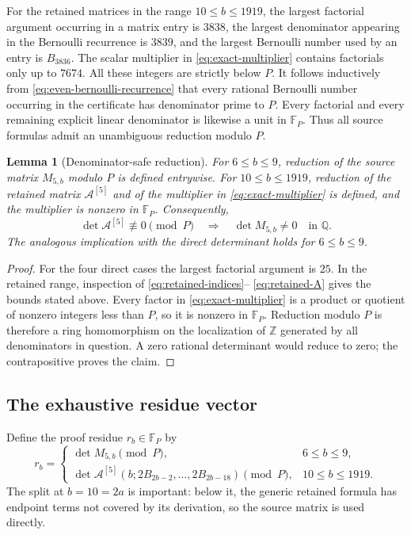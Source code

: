 \documentclass[11pt]{article}
\newtheorem{lemma}[theorem]{Lemma}
\theoremstyle{definition}
\newcommand{\Q}{\mathbb{Q}}
\newcommand{\Z}{\mathbb{Z}}
\newcommand{\F}{\mathbb{F}}
\newcommand{\A}{\mathcal{A}}
\begin{document}
For the retained matrices in the range $10\le b\le1919$, the largest
factorial argument occurring in a matrix entry is $3838$, the largest
denominator appearing in the Bernoulli recurrence is $3839$, and the
largest Bernoulli number used by an entry is $B_{3836}$.  The scalar
multiplier in \eqref{eq:exact-multiplier} contains factorials only up to
$7674$.  All these integers are strictly below $P$.  It follows
inductively from \eqref{eq:even-bernoulli-recurrence} that every rational
Bernoulli number occurring in the certificate has denominator prime to
$P$.  Every factorial and every remaining explicit linear denominator
is likewise a unit in $\F_P$.  Thus all source formulas admit an
unambiguous reduction modulo $P$.

\begin{lemma}[Denominator-safe reduction]
\label{lem:denominator-safe}
For $6\le b\le9$, reduction of the source matrix $M_{5,b}$ modulo $P$
is defined entrywise.  For $10\le b\le1919$, reduction of the retained
matrix $\A^{[5]}$ and of the multiplier in
\eqref{eq:exact-multiplier} is defined, and the multiplier is nonzero in
$\F_P$.  Consequently,
\[
 \det\A^{[5]}\not\equiv0\pmod P
 \quad\Longrightarrow\quad
 \det M_{5,b}\ne0\quad\text{in }\Q.
\]
The analogous implication with the direct determinant holds for
$6\le b\le9$.
\end{lemma}

\begin{proof}
For the four direct cases the largest factorial argument is $25$.  In
the retained range, inspection of \eqref{eq:retained-indices}--
\eqref{eq:retained-A} gives the bounds stated above.  Every factor in
\eqref{eq:exact-multiplier} is a product or quotient of nonzero
integers less than $P$, so it is nonzero in $\F_P$.  Reduction modulo
$P$ is therefore a ring homomorphism on the localization of $\Z$
generated by all denominators in question.  A zero rational determinant
would reduce to zero; the contrapositive proves the claim.
\end{proof}

\subsection{The exhaustive residue vector}

Define the proof residue $r_b\in\F_P$ by
\begin{equation}
 r_b=
 \begin{cases}
  \det M_{5,b}\pmod P,&6\le b\le9,\\[2mm]
  \det\A^{[5]}(b;2B_{2b-2},\ldots,2B_{2b-18})\pmod P,
      &10\le b\le1919.
 \end{cases}
 \label{eq:proof-residue}
\end{equation}
The split at $b=10=2a$ is important: below it, the generic retained
formula has endpoint terms not covered by its derivation, so the source
matrix is used directly.
\end{document}
